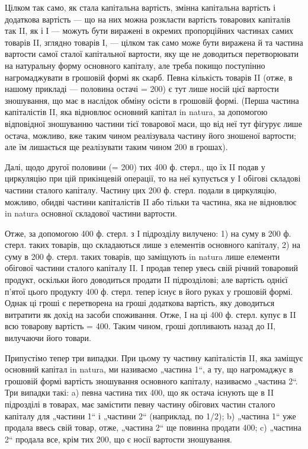Цілком так само, як стала капітальна вартість, змінна капітальна вартість
і додаткова вартість — що на них можна розкласти вартість товарових
капіталів так II, як і І — можуть бути виражені в окремих пропорційних
частинах самих товарів II, зглядно товарів І, — цілком так само
може бути виражена й та частина вартости самої сталої капітальної вартости,
яку ще не доводиться перетворювати на натуральну форму основного
капіталу, але треба покищо поступінно нагромаджувати в грошовій
формі як скарб. Певна кількість товарів II (отже, в нашому прикладі —
половина остачі = 200) є тут лише носій цієї вартости зношування, що
має в наслідок обміну осісти в грошовій формі. (Перша частина капіталістів
II, яка відновлює основний капітал in natura, за допомогою відповідної
зношуванню частини тієї товарової маси, що від неї тут фігурує
лише остача, можливо, вже таким чином реалізувала частину його зношеної
вартости; але їм лишається ще реалізувати таким чином
200 в грошах).

Далі, щодо другої половини (= 200) тих 400 ф. стерл., що їх II
подав у циркуляцію при цій прикінцевій операції, то на неї купується
у I обігові складові частини сталого капіталу. Частину цих 200 ф. стерл.
подали в циркуляцію, можливо, обидві частини капіталістів II або тільки
та частина, яка не відновлює in natura основної складової частини
вартости.

Отже, за допомогою 400 ф. стерл. з I підрозділу вилучено: 1) на
суму в 200 ф. стерл. таких товарів, що складаються лише з елементів
основного капіталу, 2) на суму в 200 ф. стерл. таких товарів, що заміщують
in natura лише елементи обігової частини сталого капіталу II.
I продав тепер увесь свій річний товаровий продукт, оскільки його доводиться
продати II підрозділові; але вартість однієї п’ятої цього продукту
400 ф. стерл. тепер існує в його руках у грошовій формі. Однак ці
гроші є перетворена на гроші додаткова вартість, яку доводиться витратити
як дохід на засоби споживання. Отже, I на ці 400 ф. стерл. купує
в II всю товарову вартість = 400. Таким чином, гроші допливають назад
до II, вилучаючи його товари.

Припустімо тепер три випадки. При цьому ту частину капіталістів II,
яка заміщує основний капітал in natura, ми називаємо „частина 1“, а
ту, що нагромаджує в грошовій формі вартість зношування основного
капіталу, називаємо „частина 2“. Три випадки такі: a) певна частина тих
400, що як остача існують ще в II підрозділі в товарах, має замістити певну
частину обігових частин сталого капіталу для „частини 1“ і „частини 2“
(наприклад, по 1/2); b) „частина 1“ уже продала ввесь свій товар, отже,
„частина 2“ ще повинна продати 400; c) „частина 2“ продала все, крім
тих 200, що є носії вартости зношування.

